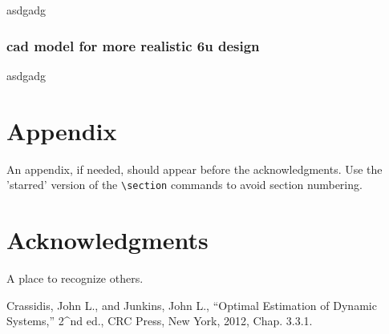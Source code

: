 \documentclass[]{aiaa-tc}%
\begin{document}
asdgadg

\subsubsection{cad model for more realistic 6u design}

asdgadg

\section*{Appendix}

An appendix, if needed, should appear before the acknowledgments.
Use the 'starred' version of the \verb|\section| commands to avoid
section numbering.

\section*{Acknowledgments}

A place to recognize others.

\begin{thebibliography}{9}%
 Crassidis, John L., and Junkins, John L., “Optimal Estimation of Dynamic Systems,” 2^{nd} ed., CRC Press, New York, 2012, Chap. 3.3.1.

\end{thebibliography}
\end{document}
